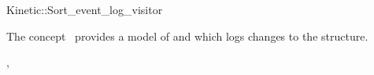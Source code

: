 

\begin{ccRefClass}{Kinetic::Sort_event_log_visitor}


\ccDefinition
  
The concept \ccRefName\ provides a model of
 and  which logs changes to the structure.

\ccIsModel

, 

\ccSeeAlso



\end{ccRefClass}


